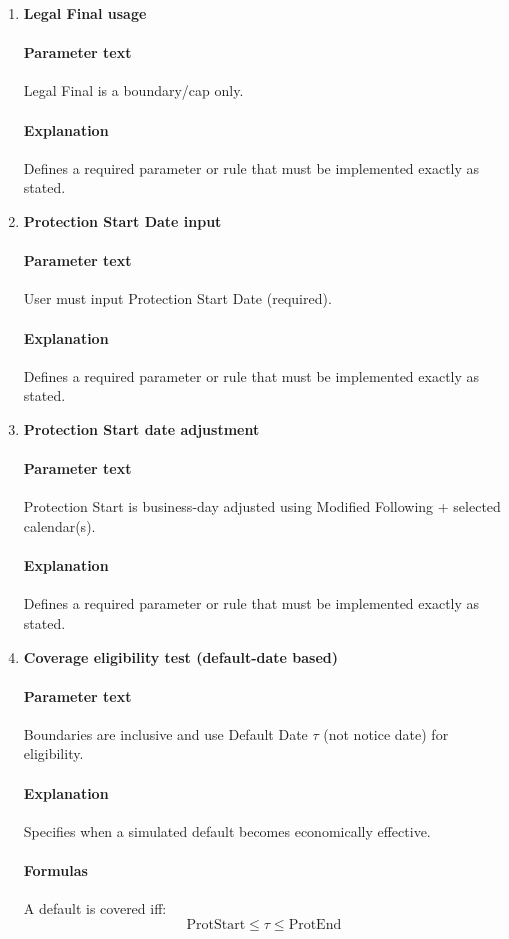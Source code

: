 \documentclass[11pt]{article}
\begin{document}
\begin{enumerate}[label=\arabic*),leftmargin=*,align=left]
\item \textbf{Legal Final usage}
\paragraph{Parameter text} Legal Final is a boundary/cap only.
\paragraph{Explanation} Defines a required parameter or rule that must be implemented exactly as stated.

\item \textbf{Protection Start Date input}
\paragraph{Parameter text} User must input Protection Start Date (required).
\paragraph{Explanation} Defines a required parameter or rule that must be implemented exactly as stated.

\item \textbf{Protection Start date adjustment}
\paragraph{Parameter text} Protection Start is business-day adjusted using Modified Following + selected calendar(s).
\paragraph{Explanation} Defines a required parameter or rule that must be implemented exactly as stated.

\item \textbf{Coverage eligibility test (default-date based)}
\paragraph{Parameter text} Boundaries are inclusive and use Default Date $\tau$ (not notice date) for eligibility.
\paragraph{Explanation} Specifies when a simulated default becomes economically effective.
\paragraph{Formulas} A default is covered iff:
\[ \text{ProtStart} \le \tau \le \text{ProtEnd} \]


\end{enumerate}
\end{document}
